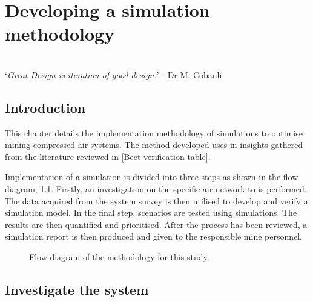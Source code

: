 \chapter{Developing a simulation methodology}
\thispagestyle{empty}
\vspace{38em}
\hrulefill
\\
\enquote*{\textit{Great Design is iteration of good design.}} - Dr M. Cobanli\\
\newpage
\section{Introduction}
This chapter details the implementation methodology of simulations to optimise mining compressed air systems. The method developed uses in insights gathered from the literature reviewed in \cref{Beet verification table}.
\par 
Implementation of a simulation is divided into three steps as shown in the flow diagram, \cref{fig: Methodology}. Firstly, an investigation on the specific air network to is performed. The data acquired from the system survey is then utilised to develop and verify a simulation model. In the final step, scenarios are tested using simulations. The results are then quantified and prioritised. After the process has been reviewed, a simulation report is then produced and given to the responsible mine personnel.

\begin{figure}[h]
	\centering
	\caption{Flow diagram of the methodology for this study.}
	\label{fig: Methodology}
\end{figure}
\section{Investigate the system}
